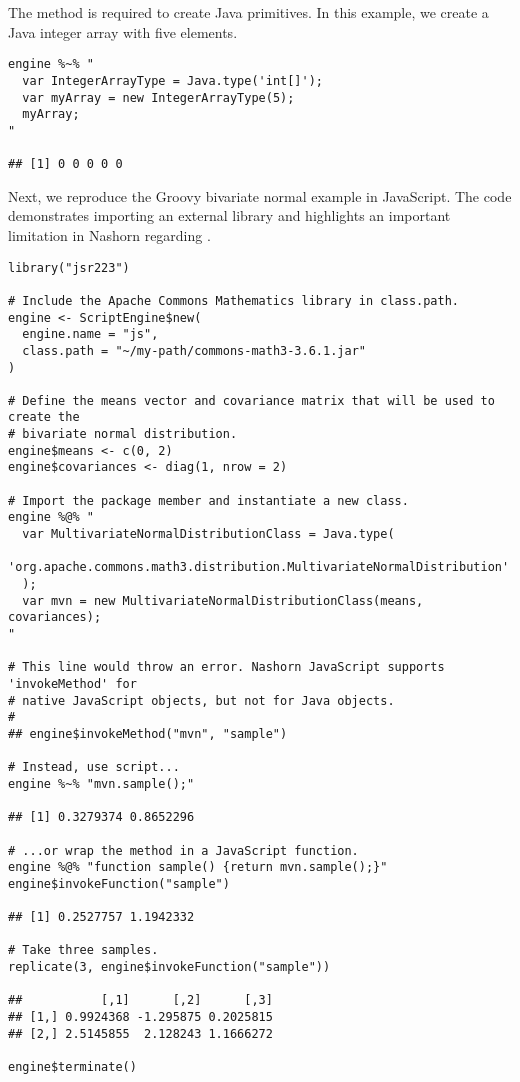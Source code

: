 The  method is required to create Java primitives. In this example, we create a Java integer array with five elements.

\begin{verbatim}
engine %~% "
  var IntegerArrayType = Java.type('int[]');
  var myArray = new IntegerArrayType(5);
  myArray;
"

## [1] 0 0 0 0 0
\end{verbatim}

Next, we reproduce the Groovy bivariate normal example in JavaScript. The code demonstrates importing an external library and highlights an important limitation in Nashorn regarding .

\begin{verbatim}
library("jsr223")

# Include the Apache Commons Mathematics library in class.path.
engine <- ScriptEngine$new(
  engine.name = "js",
  class.path = "~/my-path/commons-math3-3.6.1.jar"
)

# Define the means vector and covariance matrix that will be used to create the
# bivariate normal distribution.
engine$means <- c(0, 2)
engine$covariances <- diag(1, nrow = 2)

# Import the package member and instantiate a new class.
engine %@% "
  var MultivariateNormalDistributionClass = Java.type(
    'org.apache.commons.math3.distribution.MultivariateNormalDistribution'
  );
  var mvn = new MultivariateNormalDistributionClass(means, covariances);
"

# This line would throw an error. Nashorn JavaScript supports 'invokeMethod' for
# native JavaScript objects, but not for Java objects.
#
## engine$invokeMethod("mvn", "sample")

# Instead, use script...
engine %~% "mvn.sample();"

## [1] 0.3279374 0.8652296

# ...or wrap the method in a JavaScript function.
engine %@% "function sample() {return mvn.sample();}"
engine$invokeFunction("sample")

## [1] 0.2527757 1.1942332

# Take three samples.
replicate(3, engine$invokeFunction("sample"))

##           [,1]      [,2]      [,3]
## [1,] 0.9924368 -1.295875 0.2025815
## [2,] 2.5145855  2.128243 1.1666272

engine$terminate()
\end{verbatim}

